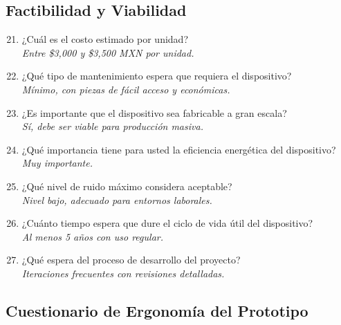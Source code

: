 \subsection{Factibilidad y Viabilidad}

\begin{enumerate}
    \setcounter{enumi}{20}
    \item ¿Cuál es el costo estimado por unidad? \\
    \textit{Entre \$3,000 y \$3,500 MXN por unidad.}
    
    \item ¿Qué tipo de mantenimiento espera que requiera el dispositivo? \\
    \textit{Mínimo, con piezas de fácil acceso y económicas.}
            
    \item ¿Es importante que el dispositivo sea fabricable a gran escala? \\
    \textit{Sí, debe ser viable para producción masiva.}
    
    \item ¿Qué importancia tiene para usted la eficiencia energética del dispositivo? \\
    \textit{Muy importante.}
    
    \item ¿Qué nivel de ruido máximo considera aceptable? \\
    \textit{Nivel bajo, adecuado para entornos laborales.}
    
    \item ¿Cuánto tiempo espera que dure el ciclo de vida útil del dispositivo? \\
    \textit{Al menos 5 años con uso regular.}
        
    \item ¿Qué espera del proceso de desarrollo del proyecto? \\
    \textit{Iteraciones frecuentes con revisiones detalladas.}
\end{enumerate}

\subsection{Cuestionario de Ergonomía del Prototipo}  


